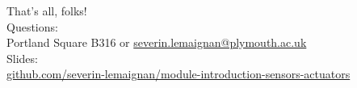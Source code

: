 \documentclass[compress]{beamer}
\begin{document}
\begin{frame}{}
    \begin{center}
        \Large
        That's all, folks!\\[2em]
        \normalsize
        Questions:\\
        Portland Square B316 or \url{severin.lemaignan@plymouth.ac.uk} \\[1em]

        Slides:\\
        \href{https://github.com/severin-lemaignan/module-introduction-sensors-actuators}{\small
        github.com/severin-lemaignan/module-introduction-sensors-actuators}


    \end{center}
\end{frame}
\end{document}
